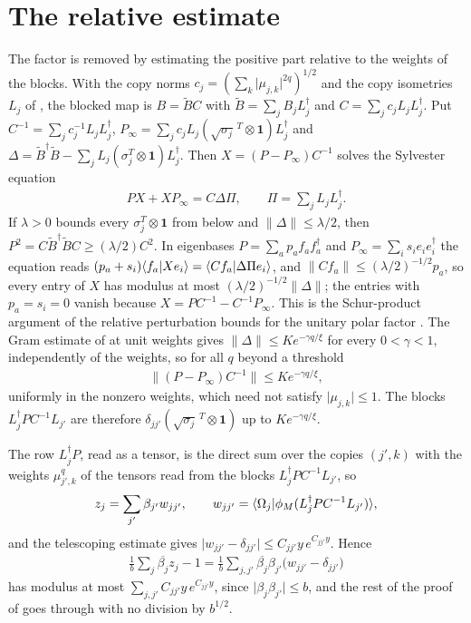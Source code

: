 \documentclass{article}
\begin{document}
\section{The relative estimate}
The factor is removed by estimating the positive part relative to the weights of the blocks.
With the copy norms $c_j=(\sum_k\lvert\mu_{j,k}\rvert^{2q})^{1/2}$ and the copy isometries
$L_j$ of \cite{gap:mswc24_repeated_block_corrected_state}, the blocked map is
$B=\widetilde BC$ with $\widetilde B=\sum_jB_jL_j^\dagger$ and $C=\sum_jc_jL_jL_j^\dagger$. Put
$C^{-1}=\sum_jc_j^{-1}L_jL_j^\dagger$, $P_\infty=\sum_jc_jL_j(\sqrt{\sigma_j}^{\,T}\otimes
\mathbf 1)L_j^\dagger$ and $\Delta=\widetilde B^\dagger\widetilde B-\sum_jL_j(\sigma_j^T\otimes
\mathbf 1)L_j^\dagger$. Then $X=(P-P_\infty)C^{-1}$ solves the Sylvester equation
\begin{align*}
    PX+XP_\infty=C\Delta\Pi,\qquad\Pi=\sum_jL_jL_j^\dagger .
\end{align*}
If $\lambda>0$ bounds every $\sigma_j^T\otimes\mathbf 1$ from below and
$\lVert\Delta\rVert\leq\lambda/2$, then $P^2=C\widetilde B^\dagger\widetilde BC\geq(\lambda/2)C^2$.
In eigenbases $P=\sum_ap_af_af_a^\dagger$ and $P_\infty=\sum_is_ie_ie_i^\dagger$ the equation
reads $(p_a+s_i)\langle f_a | Xe_i \rangle=\langle Cf_a | \Delta\Pi e_i \rangle$, and
$\lVert Cf_a\rVert\leq(\lambda/2)^{-1/2}p_a$, so every entry of $X$ has modulus at most
$(\lambda/2)^{-1/2}\lVert\Delta\rVert$; the entries with $p_a=s_i=0$ vanish because
$X=PC^{-1}-C^{-1}P_\infty$. This is the Schur-product argument of the relative perturbation
bounds for the unitary polar factor \cite{Li1997Relative}. The Gram estimate of
\cite{gap:mswc24_block_form_mixed_overlap} at unit weights gives
$\lVert\Delta\rVert\leq Ke^{-\gamma q/\xi}$ for every $0<\gamma<1$, independently of the
weights, so for all $q$ beyond a threshold
\begin{align*}
    \lVert(P-P_\infty)C^{-1}\rVert\leq Ke^{-\gamma q/\xi},
\end{align*}
uniformly in the nonzero weights, which need not satisfy $\lvert\mu_{j,k}\rvert\leq1$. The
blocks $L_j^\dagger PC^{-1}L_{j'}$ are therefore $\delta_{jj'}(\sqrt{\sigma_j}^{\,T}\otimes
\mathbf 1)$ up to $Ke^{-\gamma q/\xi}$.

The row $L_j^\dagger P$, read as a tensor, is the direct sum over the copies $(j',k)$ with the
weights $\mu_{j',k}^q$ of the tensors read from the blocks $L_j^\dagger PC^{-1}L_{j'}$, so
\begin{align*}
    z_j=\sum_{j'}\beta_{j'}w_{jj'},\qquad
    w_{jj'}=\langle \Omega_j | \phi_M(L_j^\dagger PC^{-1}L_{j'}) \rangle,
\end{align*}
and the telescoping estimate gives $\lvert w_{jj'}-\delta_{jj'}\rvert\leq C_{jj'}y\,e^{C_{jj'}y}$.
Hence
\begin{align*}
    \frac1b\sum_j\overline{\beta_j}z_j-1
    =\frac1b\sum_{j,j'}\overline{\beta_j}\beta_{j'}\bigl(w_{jj'}-\delta_{jj'}\bigr)
\end{align*}
has modulus at most $\sum_{j,j'}C_{jj'}y\,e^{C_{jj'}y}$, since
$\lvert\beta_j\beta_{j'}\rvert\leq b$, and the rest of the proof of
\cite{gap:mswc24_repeated_block_corrected_state} goes through with no division by $b^{1/2}$.
\end{document}
